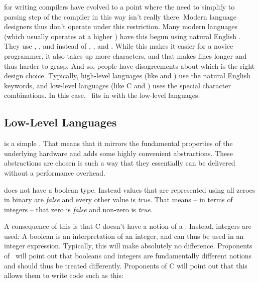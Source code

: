  for writing compilers have evolved to a point where the need to simplify to parsing step of the compiler in this way isn't really there. Modern language designers thus don't operate under this restriction. Many modern languages (which usually operates at a higher ) have this begun using natural English . They use , ,  and  instead of \keywordname{\&\&}, \keywordname{||}, \keywordname{\^{}} and \keywordname{!}. While this makes it easier for a novice programmer, it also takes up more characters, and that makes lines longer and thus harder to grasp. And so, people have disagreements about which is the right design choice. Typically, high-level languages (like  and ) use the natural English keywords, and low-level languages (like C and ) uses the special character combinations. In this case, \csharp\ fits in with the low-level languages.

\subsection{Low-Level Languages}

 is a simple . That means that it mirrors the fundamental properties of the underlying hardware and adds some highly convenient abstractions. These abstractions are chosen is such a way that they essentially can be delivered without a performance overhead.

 does not have a boolean type. Instead  values that are represented using all zeroes in binary are \textsl{false} and every other value is \textsl{true}. That means -- in terms of integers -- that zero is \textsl{false} and non-zero is \textsl{true}. %

A consequence of this is that C doesn't have a notion of a . Instead, integers are used: A boolean is an interpretation of an integer, and can thus be used in an integer expression. Typically, this will make absolutely no difference. Proponents of \csharp\ will point out that booleans and integers are fundamentally different notions and should thus be treated differently. Proponents of C will point out that this allows them to write code such as this:

